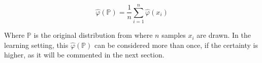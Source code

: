\begin{equation}
\label{eq:embedding}
\hat{\varphi}(\mathbb{P})=\frac{1}{n}\sum_{i=1}^n\hat{\varphi}(x_i)
\end{equation}

Where $\mathbb{P}$ is the original distribution from where $n$ samples $x_i$ are
drawn. In the learning setting, this $\hat{\varphi}(\mathbb{P})$ can be
considered more than once, if the certainty is higher, as it will be commented
in the next section.
